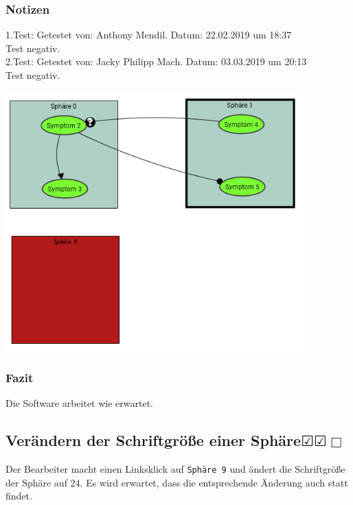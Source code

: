 \documentclass[enabledeprecatedfontcommands]{scrartcl}
\newcommand{\subsectiont}[2]{\subsection[#1]{#1{\normalsize\normalfont #2}}}
\newcommand{\leer}{$\Box$}
\newcommand{\ok}{$\CheckedBox$}
\begin{document}
\subsubsection{Notizen}
1.Test: Getestet von: Anthony Mendil. Datum: 22.02.2019 um 18:37 \\
Test negativ.\\
2.Test: Getestet von: Jacky Philipp Mach. Datum: 03.03.2019 um 20:13 \\
Test negativ. 
\begin{center}
\includegraphics[height=10cm]{2_15.PNG}
\end{center}
\subsubsection{Fazit}
Die Software arbeitet wie erwartet.

\subsectiont{Verändern der Schriftgröße einer Sphäre}{\dotfill\ok\ok\leer}
Der Bearbeiter macht einen Linksklick auf \texttt{Sphäre 9} und ändert die Schriftgröße der Sphäre auf 24. Es wird erwartet, dass die entsprechende Änderung auch statt findet. 
\end{document}

